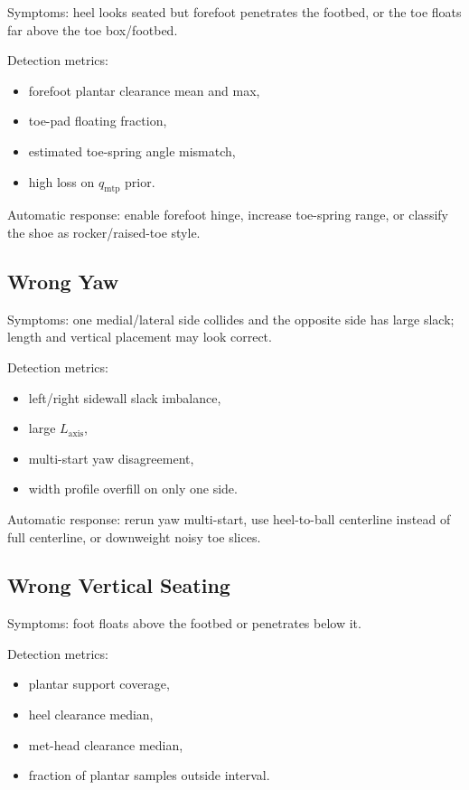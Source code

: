 \documentclass[11pt]{article}
\begin{document}
Symptoms: heel looks seated but forefoot penetrates the footbed, or the toe floats far above the toe box/footbed.

Detection metrics:

\begin{itemize}
  \item forefoot plantar clearance mean and max,
  \item toe-pad floating fraction,
  \item estimated toe-spring angle mismatch,
  \item high loss on $q_{\mathrm{mtp}}$ prior.
\end{itemize}

Automatic response: enable forefoot hinge, increase toe-spring range, or classify the shoe as rocker/raised-toe style.

\subsection{Wrong Yaw}

Symptoms: one medial/lateral side collides and the opposite side has large slack; length and vertical placement may look correct.

Detection metrics:

\begin{itemize}
  \item left/right sidewall slack imbalance,
  \item large $L_{\mathrm{axis}}$,
  \item multi-start yaw disagreement,
  \item width profile overfill on only one side.
\end{itemize}

Automatic response: rerun yaw multi-start, use heel-to-ball centerline instead of full centerline, or downweight noisy toe slices.

\subsection{Wrong Vertical Seating}

Symptoms: foot floats above the footbed or penetrates below it.

Detection metrics:

\begin{itemize}
  \item plantar support coverage,
  \item heel clearance median,
  \item met-head clearance median,
  \item fraction of plantar samples outside interval.
\end{itemize}
\end{document}
